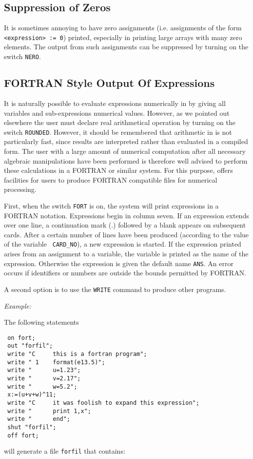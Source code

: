 \subsection{Suppression of Zeros}

It is sometimes annoying to have zero assignments (i.e. assignments of the
form {\tt <expression> := 0}) printed, especially in printing large arrays
with many zero elements.  The output from such assignments can be
suppressed by turning on the switch {\tt NERO}.

\subsection{{FORTRAN} Style Output Of Expressions}

It is naturally possible to evaluate expressions numerically in {\REDUCE} by
giving all variables and sub-expressions numerical values. However, as we
pointed out elsewhere the user must declare real arithmetical operation by
turning on the switch {\tt ROUNDED}.  However, it should be
remembered that arithmetic in {\REDUCE} is not particularly fast, since
results are interpreted rather than evaluated in a compiled form. The user
with a large amount of numerical computation after all necessary algebraic
manipulations have been performed is therefore well advised to perform
these calculations in a FORTRAN or similar system.  For
this purpose, {\REDUCE} offers facilities for users to produce FORTRAN
compatible files for numerical processing.

\hypertarget{CARD_NO}{}
First, when the switch {\tt FORT} is on, the system will
print expressions in a FORTRAN notation.  Expressions begin in column
seven.  If an expression extends over one line, a continuation mark (.)
followed by a blank appears on subsequent cards.  After a certain number
of lines have been produced (according to the value of the variable {\tt
CARD\_NO}), a new expression is started.  If the
expression printed arises from an assignment to a variable, the variable
is printed as the name of the expression.  Otherwise the expression is
given the default name {\tt ANS}.  An error occurs if identifiers or
numbers are outside the bounds permitted by FORTRAN.

A second option is to use the {\tt WRITE} command to produce other programs.

{\it Example:}

The following {\REDUCE} statements
\begin{verbatim}
 on fort;
 out "forfil";
 write "C     this is a fortran program";
 write " 1    format(e13.5)";
 write "      u=1.23";
 write "      v=2.17";
 write "      w=5.2";
 x:=(u+v+w)^11;
 write "C     it was foolish to expand this expression";
 write "      print 1,x";
 write "      end";
 shut "forfil";
 off fort;
\end{verbatim}
will generate a file {\tt forfil} that contains:

